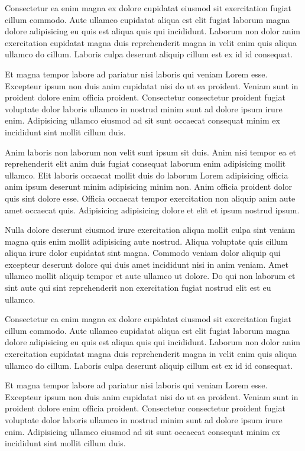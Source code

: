 \documentclass[a4paper,10pt,french]{sphinxmanual}
\begin{document}
Consectetur ea enim magna ex dolore cupidatat eiusmod sit exercitation fugiat cillum commodo. Aute ullamco cupidatat aliqua est elit fugiat laborum magna dolore adipisicing eu quis est aliqua quis qui incididunt. Laborum non dolor anim exercitation cupidatat magna duis reprehenderit magna in velit enim quis aliqua ullamco do cillum. Laboris culpa deserunt aliquip cillum est ex id id consequat.

Et magna tempor labore ad pariatur nisi laboris qui veniam Lorem esse. Excepteur ipsum non duis anim cupidatat nisi do ut ea proident. Veniam sunt in proident dolore enim officia proident. Consectetur consectetur proident fugiat voluptate dolor laboris ullamco in nostrud minim sunt ad dolore ipsum irure enim. Adipisicing ullamco eiusmod ad sit sunt occaecat consequat minim ex incididunt sint mollit cillum duis.

Anim laboris non laborum non velit sunt ipsum sit duis. Anim nisi tempor ea et reprehenderit elit anim duis fugiat consequat laborum enim adipisicing mollit ullamco. Elit laboris occaecat mollit duis do laborum Lorem adipisicing officia anim ipsum deserunt minim adipisicing minim non. Anim officia proident dolor quis sint dolore esse. Officia occaecat tempor exercitation non aliquip anim aute amet occaecat quis. Adipisicing adipisicing dolore et elit et ipsum nostrud ipsum.

Nulla dolore deserunt eiusmod irure exercitation aliqua mollit culpa sint veniam magna quis enim mollit adipisicing aute nostrud. Aliqua voluptate quis cillum aliqua irure dolor cupidatat sint magna. Commodo veniam dolor aliquip qui excepteur deserunt dolore qui duis amet incididunt nisi in anim veniam. Amet ullamco mollit aliquip tempor et aute ullamco ut dolore. Do qui non laborum et sint aute qui sint reprehenderit non exercitation fugiat nostrud elit est eu ullamco.

Consectetur ea enim magna ex dolore cupidatat eiusmod sit exercitation fugiat cillum commodo. Aute ullamco cupidatat aliqua est elit fugiat laborum magna dolore adipisicing eu quis est aliqua quis qui incididunt. Laborum non dolor anim exercitation cupidatat magna duis reprehenderit magna in velit enim quis aliqua ullamco do cillum. Laboris culpa deserunt aliquip cillum est ex id id consequat.

Et magna tempor labore ad pariatur nisi laboris qui veniam Lorem esse. Excepteur ipsum non duis anim cupidatat nisi do ut ea proident. Veniam sunt in proident dolore enim officia proident. Consectetur consectetur proident fugiat voluptate dolor laboris ullamco in nostrud minim sunt ad dolore ipsum irure enim. Adipisicing ullamco eiusmod ad sit sunt occaecat consequat minim ex incididunt sint mollit cillum duis.



\renewcommand{\indexname}{Index}
\footnotesize\raggedright\printindex
\end{document}
